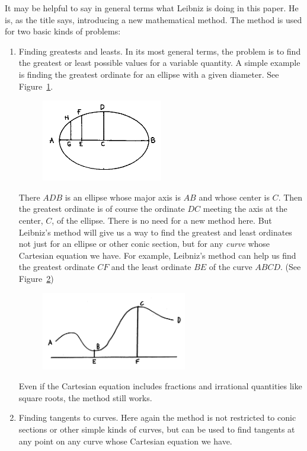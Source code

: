 \documentclass[polutonikogreek,english,twoside,openright]{article}
\begin{document}
It may be helpful to say in general terms what Leibniz is doing in this paper.  He is, as the title says, introducing a new mathematical method.  The method is used for two basic kinds of problems: 
\begin{enumerate} 
\item Finding greatests and leasts.  In its most general terms, the problem is to find the greatest or least possible values for a variable quantity.  A simple example is finding the greatest ordinate for an ellipse with a given diameter.  See Figure~\ref{glord}.  
\begin{figure}[htp]
\begin{center}
\includegraphics[width=0.5\textwidth]{fig/Figure1}
\vspace{-20pt}
\caption{}
\label{glord}
\end{center}
\end{figure}


There $ADB$ is an ellipse whose major axis is $AB$ and whose center is $C$.  Then the greatest ordinate is of course the ordinate $DC$ meeting the axis at the center, $C$, of the ellipse.  There is no need for a new method here. But Leibniz's method will give us a way to find the greatest and least ordinates not just for an ellipse or other conic section, but for any {\em  curve} whose Cartesian equation we have.   For example,  Leibniz's method can help us find the greatest ordinate $CF$ and the least ordinate $BE$ of the curve $ABCD$. (See Figure~\ref{glord2})
\begin{figure}[htp]
\begin{center}
\includegraphics[width=0.6\textwidth]{fig/Figure1A}
\vspace{-20pt}
\caption{}
\label{glord2}
\end{center}
\end{figure}
 

Even if the Cartesian equation includes fractions and irrational quantities like square roots, the method still works.

\item Finding tangents to curves.  Here again the method is not restricted to conic sections or other simple kinds of curves, but can be used to find tangents at any point on any curve whose Cartesian equation we have.
\end{enumerate}
\end{document}
